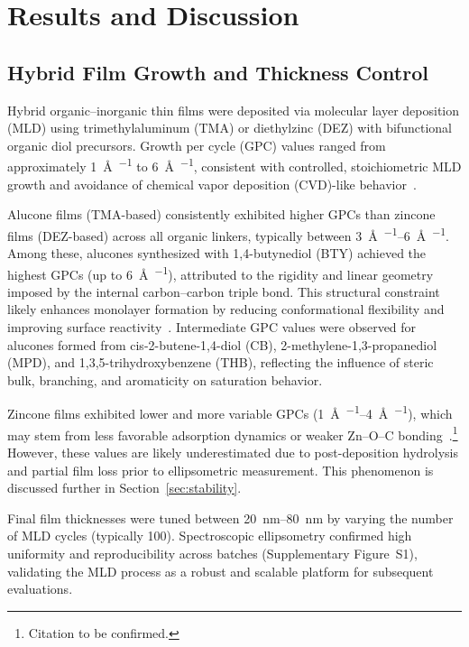 \section{Results and Discussion}

\subsection{Hybrid Film Growth and Thickness Control}

Hybrid organic--inorganic thin films were deposited via molecular layer deposition (MLD) using trimethylaluminum (TMA) or diethylzinc (DEZ) with bifunctional organic diol precursors. Growth per cycle (GPC) values ranged from approximately \SI{1}{\angstrom\per\cycle} to \SI{6}{\angstrom\per\cycle}, consistent with controlled, stoichiometric MLD growth and avoidance of chemical vapor deposition (CVD)-like behavior~\cite{Wang2022}.

Alucone films (TMA-based) consistently exhibited higher GPCs than zincone films (DEZ-based) across all organic linkers, typically between \SIrange{3}{6}{\angstrom\per\cycle}. Among these, alucones synthesized with 1,4-butynediol (BTY) achieved the highest GPCs (up to \SI{6}{\angstrom\per\cycle}), attributed to the rigidity and linear geometry imposed by the internal carbon--carbon triple bond. This structural constraint likely enhances monolayer formation by reducing conformational flexibility and improving surface reactivity~\cite{Smith2023}. Intermediate GPC values were observed for alucones formed from cis-2-butene-1,4-diol (CB), 2-methylene-1,3-propanediol (MPD), and 1,3,5-trihydroxybenzene (THB), reflecting the influence of steric bulk, branching, and aromaticity on saturation behavior.

Zincone films exhibited lower and more variable GPCs (\SIrange{1}{4}{\angstrom\per\cycle}), which may stem from less favorable adsorption dynamics or weaker Zn--O--C bonding~\cite{Zhao2023}.\footnote{Citation to be confirmed.} However, these values are likely underestimated due to post-deposition hydrolysis and partial film loss prior to ellipsometric measurement. This phenomenon is discussed further in Section~\ref{sec:stability}.

Final film thicknesses were tuned between \SIrange{20}{80}{\nano\meter} by varying the number of MLD cycles (typically 100). Spectroscopic ellipsometry confirmed high uniformity and reproducibility across batches (Supplementary Figure~S1), validating the MLD process as a robust and scalable platform for subsequent evaluations.

